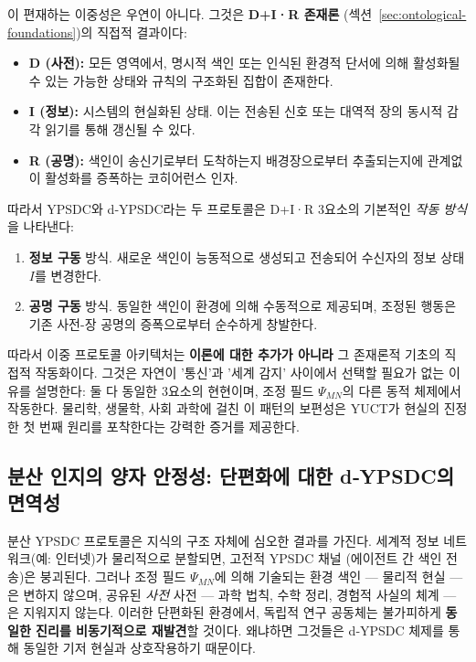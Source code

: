 \documentclass[11pt,a4paper]{article}
\begin{document}
\medskip
\noindent
이 편재하는 이중성은 우연이 아니다. 그것은 \textbf{D+I·R 존재론} (섹션~\ref{sec:ontological-foundations})의 직접적 결과이다:
\begin{itemize}[leftmargin=*]
	\item \textbf{D (사전):} 모든 영역에서, 명시적 색인 또는 인식된 환경적 단서에 의해 활성화될 수 있는 가능한 상태와 규칙의 구조화된 집합이 존재한다.
	\item \textbf{I (정보):} 시스템의 현실화된 상태. 이는 전송된 신호 또는 대역적 장의 동시적 감각 읽기를 통해 갱신될 수 있다.
	\item \textbf{R (공명):} 색인이 송신기로부터 도착하는지 배경장으로부터 추출되는지에 관계없이 활성화를 증폭하는 코히어런스 인자.
\end{itemize}

따라서 YPSDC와 d‑YPSDC라는 두 프로토콜은 D+I·R 3요소의 기본적인 \emph{작동 방식}을 나타낸다:
\begin{enumerate}[leftmargin=*]
	\item \textbf{정보 구동} 방식. 새로운 색인이 능동적으로 생성되고 전송되어 수신자의 정보 상태 $I$를 변경한다.
	\item \textbf{공명 구동} 방식. 동일한 색인이 환경에 의해 수동적으로 제공되며, 조정된 행동은 기존 사전-장 공명의 증폭으로부터 순수하게 창발한다.
\end{enumerate}

따라서 이중 프로토콜 아키텍처는 \textbf{이론에 대한 추가가 아니라} 그 존재론적 기초의 직접적 작동화이다. 그것은 자연이 '통신'과 '세계 감지' 사이에서 선택할 필요가 없는 이유를 설명한다: 둘 다 동일한 3요소의 현현이며, 조정 필드 $\Psi_{MN}$의 다른 동적 체제에서 작동한다. 물리학, 생물학, 사회 과학에 걸친 이 패턴의 보편성은 YUCT가 현실의 진정한 첫 번째 원리를 포착한다는 강력한 증거를 제공한다.

\subsection{분산 인지의 양자 안정성: 단편화에 대한 d‑YPSDC의 면역성}
\label{subsec:quantum-stability-cognition}

분산 YPSDC 프로토콜은 지식의 구조 자체에 심오한 결과를 가진다. 세계적 정보 네트워크(예: 인터넷)가 물리적으로 분할되면, 고전적 YPSDC 채널 (에이전트 간 색인 전송)은 붕괴된다. 그러나 조정 필드 $\Psi_{MN}$에 의해 기술되는 환경 색인 — 물리적 현실 — 은 변하지 않으며, 공유된 \emph{사전} 사전 — 과학 법칙, 수학 정리, 경험적 사실의 체계 — 은 지워지지 않는다. 이러한 단편화된 환경에서, 독립적 연구 공동체는 불가피하게 \textbf{동일한 진리를 비동기적으로 재발견}할 것이다. 왜냐하면 그것들은 d‑YPSDC 체제를 통해 동일한 기저 현실과 상호작용하기 때문이다.
\end{document}
